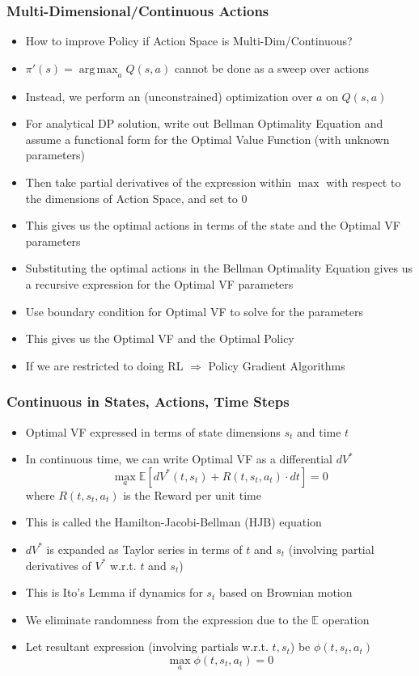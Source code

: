 \documentclass[handout]{beamer}
\DeclareMathOperator*{\argmax}{arg\,max}
\begin{document}
\begin{frame}
\frametitle{Multi-Dimensional/Continuous Actions}
\pause
\begin{itemize}[<+->]
\item How to improve Policy if Action Space is Multi-Dim/Continuous?
\item $\pi'(s) = \argmax_a Q(s,a)$ cannot be done as a sweep over actions
\item Instead, we perform an (unconstrained) optimization over $a$ on $Q(s,a)$
\item For analytical DP solution, write out Bellman Optimality Equation and assume a functional form for the Optimal Value Function (with unknown parameters)
\item Then take partial derivatives of the expression within $\max$ with respect to the dimensions of Action Space, and set to 0
\item This gives us the optimal actions in terms of the state and the Optimal VF parameters
\item Substituting the optimal actions in the Bellman Optimality Equation gives us a recursive expression for the Optimal VF parameters
\item Use boundary condition for Optimal VF to solve for the parameters
\item This gives us the Optimal VF and the Optimal Policy
\item If we are restricted to doing RL $\Rightarrow$ Policy Gradient Algorithms
\end{itemize}
\end{frame}

\begin{frame}
\frametitle{Continuous in States, Actions, Time Steps}
\pause
\begin{itemize}[<+->]
\item Optimal VF expressed in terms of state dimensions $s_t$ and time $t$
\item In continuous time, we can write Optimal VF as a differential $dV^*$
$$\max_a \mathbb{E}[dV^*(t,s_t) + R(t,s_t,a_t) \cdot dt] = 0$$
where $R(t,s_t,a_t)$ is the Reward per unit time
\item This is called the Hamilton-Jacobi-Bellman (HJB) equation
\item $dV^*$ is expanded as Taylor series in terms of $t$ and $s_t$ (involving partial derivatives of $V^*$ w.r.t. $t$ and $s_t$)
\item This is Ito's Lemma if dynamics for $s_t$ based on Brownian motion
\item We eliminate randomness from the expression due to the $\mathbb{E}$ operation
\item Let resultant expression (involving partials w.r.t. $t, s_t$) be $\phi(t,s_t,a_t)$
$$\max_a \phi(t,s_t, a_t) = 0$$
\end{itemize}
\end{frame}
\end{document}
